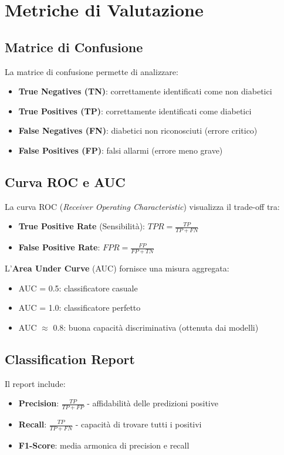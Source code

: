 \section{Metriche di Valutazione}

\subsection{Matrice di Confusione}

La matrice di confusione permette di analizzare:
\begin{itemize}
    \item \textbf{True Negatives (TN)}: correttamente identificati come non diabetici
    \item \textbf{True Positives (TP)}: correttamente identificati come diabetici
    \item \textbf{False Negatives (FN)}: diabetici non riconosciuti (errore critico)
    \item \textbf{False Positives (FP)}: falsi allarmi (errore meno grave)
\end{itemize}

\subsection{Curva ROC e AUC}

La curva ROC (\textit{Receiver Operating Characteristic}) visualizza il trade-off tra:
\begin{itemize}
    \item \textbf{True Positive Rate} (Sensibilità): $TPR = \frac{TP}{TP + FN}$
    \item \textbf{False Positive Rate}: $FPR = \frac{FP}{FP + TN}$
\end{itemize}

L'\textbf{Area Under Curve} (AUC) fornisce una misura aggregata:
\begin{itemize}
    \item AUC = 0.5: classificatore casuale
    \item AUC = 1.0: classificatore perfetto
    \item AUC $\approx$ 0.8: buona capacità discriminativa (ottenuta dai modelli)
\end{itemize}

\subsection{Classification Report}

Il report include:
\begin{itemize}
    \item \textbf{Precision}: $\frac{TP}{TP + FP}$ - affidabilità delle predizioni positive
    \item \textbf{Recall}: $\frac{TP}{TP + FN}$ - capacità di trovare tutti i positivi
    \item \textbf{F1-Score}: media armonica di precision e recall
\end{itemize}

